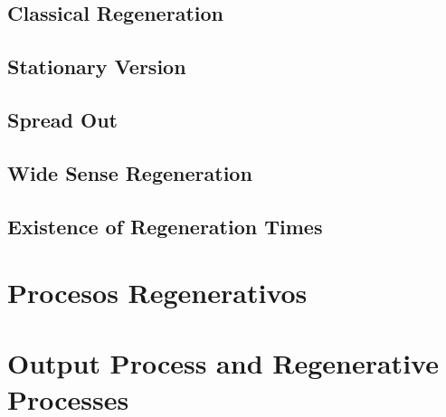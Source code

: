 \documentclass{article}
\begin{document}
\subsection{Classical Regeneration}

\subsection{Stationary Version}

\subsection{Spread Out}

\subsection{Wide Sense Regeneration}

\subsection{Existence of Regeneration Times}

\section{Procesos Regenerativos}

%
\section{Output Process and Regenerative Processes}
%

\end{document}
